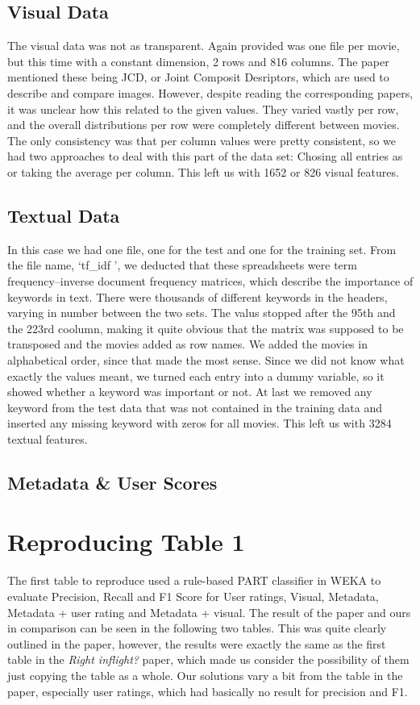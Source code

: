 \documentclass[sigconf]{acmart}
\begin{document}
\subsection{Visual Data}
The visual data was not as transparent. Again provided was one file per movie, but this time with a constant dimension, 2 rows and 816 columns. The paper mentioned these being JCD, or Joint Composit Desriptors, which are used to describe and compare images. However, despite reading the corresponding papers, it was unclear how this related to the given values. They varied vastly per row, and the overall distributions per row were completely different between movies. The only consistency was that per column values were pretty consistent, so we had two approaches to deal with this part of the data set: Chosing all entries as or taking the average per column. This left us with 1652 or 826 visual features.  

\subsection{Textual Data}
In this case we had one file, one for the test and one for the training set. From the file name, \lq tf\_idf \rq, we deducted that these spreadsheets were term frequency–inverse document frequency matrices, which describe the importance of keywords in text. There were thousands of different keywords in the headers, varying in number between the two sets. The valus stopped after the 95th and the 223rd coolumn, making it quite obvious that the matrix was supposed to be transposed and the movies added as row names. We added the movies in alphabetical order, since that made the most sense. Since we did not know what exactly the values meant, we turned each entry into a dummy variable, so it showed whether a keyword was important or not. At last we removed any keyword from the test data that was not contained in the training data and inserted any missing keyword with zeros for all movies. This left us with 3284 textual features.

\subsection{Metadata \& User Scores}

\section{Reproducing Table 1}
The first table to reproduce used a rule-based PART classifier in WEKA to evaluate Precision, Recall and F1 Score for User ratings, Visual, Metadata, Metadata + user rating and Metadata + visual. The result of the paper and ours in comparison can be seen in the following two tables. This was quite clearly outlined in the paper, however, the results were exactly the same as the first table in the \textit{Right inflight?} paper, which made us consider the possibility of them just copying the table as a whole. Our solutions vary a bit from the table in the paper, especially user ratings, which had basically no result for precision and F1.
\end{document}
